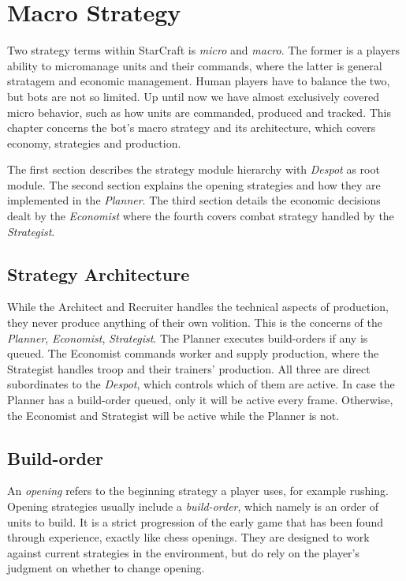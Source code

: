 \chapter{Macro Strategy}
\label{ch:strategy}
Two strategy terms within StarCraft is \emph{micro} and \emph{macro}. The former is a players ability to micromanage units and their commands, where the latter is general stratagem and economic management. Human players have to balance the two, but bots are not so limited. Up until now we have almost exclusively covered micro behavior, such as how units are commanded, produced and tracked. This chapter concerns the bot's macro strategy and its architecture, which covers economy, strategies and production.

The first section describes the strategy module hierarchy with \emph{Despot} as root module. The second section explains the opening strategies and how they are implemented in the \emph{Planner}. The third section details the economic decisions dealt by the \emph{Economist} where the fourth covers combat strategy handled by the \emph{Strategist}. 

\section{Strategy Architecture}
While the Architect and Recruiter handles the technical aspects of production, they never produce anything of their own volition. This is the concerns of the \emph{Planner}, \emph{Economist}, \emph{Strategist}. The Planner executes build-orders if any is queued. The Economist commands worker and supply production, where the Strategist handles troop and their trainers' production. All three are direct subordinates to the \emph{Despot}, which controls which of them are active. In case the Planner has a build-order queued, only it will be active every frame. Otherwise, the Economist and Strategist will be active while the Planner is not.

\section{Build-order}
\label{sec:buildOrder}
An \emph{opening} refers to the beginning strategy a player uses, for example rushing. Opening strategies usually include a \emph{build-order}, which namely is an order of units to build. It is a strict progression of the early game that has been found through experience, exactly like chess openings. They are designed to work against current strategies in the environment, but do rely on the player's judgment on whether to change opening.

